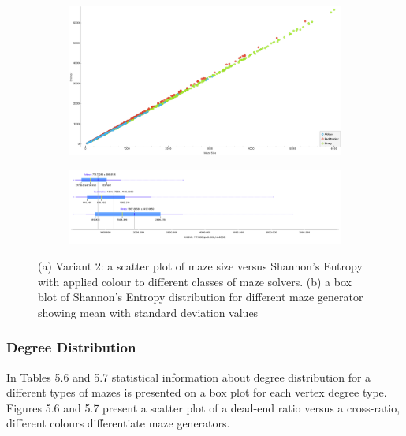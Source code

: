         \begin{figure}[!h]
            \centering
            \begin{subfigure}{0.4\textwidth}
               \includegraphics[scale = 0.15]{entropyvssize_variant2.png}
               \caption{}
            \end{subfigure}
            \begin{subfigure}{0.5\textwidth}
               \includegraphics[width=1\linewidth]{entropy_variant2.png}
               \caption{}
            \end{subfigure}
            \caption{(a) Variant 2:  a scatter plot of maze size versus Shannon's Entropy with applied colour to different classes of maze solvers.
            (b) a box blot of Shannon's Entropy distribution for different maze generator showing mean with standard deviation values}
            \end{figure}
\newpage
\subsubsection{Degree Distribution}  
In Tables 5.6 and 5.7 statistical information about degree distribution for a different types of mazes is presented on a box plot for each vertex degree type.
Figures 5.6 and 5.7 present a scatter plot of a dead-end ratio versus a cross-ratio, different colours differentiate maze generators.

